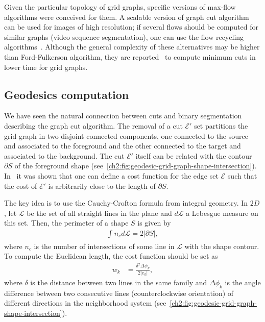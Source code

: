 Given the particular topology of grid graphs, specific versions of max-flow algorithms were conceived for them. A scalable version of graph cut algorithm~\cite{delong08scalable} can be used for images of high resolution; if several flows should be computed for similar graphs (video sequence segmentation), one can use the flow recycling algorithms~\cite{kohli05efficiently,juan06active}. Although the general complexity of these alternatives may be higher than Ford-Fulkerson algorithm, they are reported~\cite{szeliski06comparative} to compute minimum cuts in lower time for grid graphs.

\subsection{Geodesics computation}

We have seen the natural connection between cuts and binary segmentation describing the graph cut algorithm. The removal of a cut $\mathcal{E}'$ set partitions the grid graph in two disjoint connected components, one connected to the source and associated to the foreground and the other connected to the target and associated to the background. The cut $\mathcal{E}'$ itself can be related with the contour $\partial S$ of the foreground shape (see~\cref{ch2:fig:geodesic-grid-graph-shape-intersection}). In~\cite{boykov03geodesics} it was shown that one can define a cost function for the edge set $\mathcal{E}$ such that the cost of $\mathcal{E}'$ is arbitrarily close to the length of $\partial S$.

The key idea is to use the Cauchy-Crofton formula from integral geometry. In $2D$, let $\mathcal{L}$ be the set of all straight lines in the plane and $d\mathcal{L}$ a Lebesgue measure on this set. Then, the perimeter of a shape $S$ is given by
\begin{align*}
\int_{}{n_c}d{\mathcal{L}} = 2|\partial S|,
\end{align*}
%
where $n_c$ is the number of intersections of some line in $\mathcal{L}$ with the shape contour. To compute the Euclidean length, the cost function should be set as
\begin{align*}
	w_k &= \frac{ \delta^2 \Delta \phi_k }{2 |e_k|},
\end{align*}
%
where $\delta$ is the distance between two lines in the same family and $\Delta \phi_k$ is the angle difference between two consecutive lines (counterclockwise orientation) of different directions in the neighborhood system (see~\cref{ch2:fig:geodesic-grid-graph-shape-intersection}).


